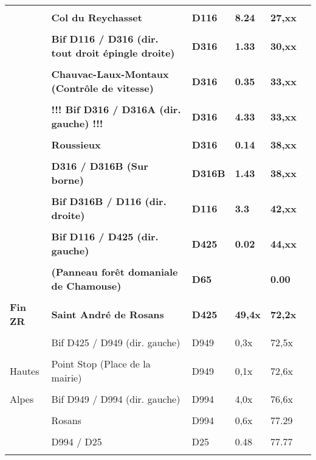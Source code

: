 \documentclass{article}%
\begin{document}
\begin{longtable}{p{2.25cm}|p{6.7cm}|p{2.0cm}|p{1.5cm}|p{1.5cm}|p{3.5cm}}
 & & & & & \\%
 &\textbf{Col du Reychasset}&\textbf{D116}&\textbf{8.24}&\textbf{27,xx}& \\%
 & & & & & \\%
 &\textbf{Bif D116 / D316 (dir. tout droit épingle droite)}&\textbf{D316}&\textbf{1.33}&\textbf{30,xx}& \\%
 & & & & & \\%
 &\textbf{Chauvac-Laux-Montaux (Contrôle de vitesse)}&\textbf{D316}&\textbf{0.35}&\textbf{33,xx}& \\%
 & & & & & \\%
 &\textbf{!!! Bif D316 / D316A (dir. gauche) !!!}&\textbf{D316}&\textbf{4.33}&\textbf{33,xx}& \\%
 & & & & & \\%
 &\textbf{Roussieux }&\textbf{D316 }&\textbf{0.14}&\textbf{38,xx}& \\%
 & & & & & \\%
 &\textbf{D316 / D316B (Sur borne)}&\textbf{D316B}&\textbf{1.43}&\textbf{38,xx}& \\%
 & & & & & \\%
 &\textbf{Bif D316B / D116 (dir. droite)}&\textbf{D116}&\textbf{3.3}&\textbf{42,xx}& \\%
 & & & & & \\%
 &\textbf{Bif D116 / D425 (dir. gauche)}&\textbf{D425}&\textbf{0.02}&\textbf{44,xx}& \\%
 & & & & & \\%
\textbf{ }&\textbf{(Panneau forêt domaniale de Chamouse)}&\textbf{D65}& &\textbf{0.00}& \\%
\hline& & & & & \\%
\textbf{Fin ZR }&\textbf{Saint André de Rosans }&\textbf{D425}&\textbf{49,4x}&\textbf{72,2x}& \\%
 & & & & & \\%
 &Bif D425 / D949 (dir. gauche)&D949&0,3x&72,5x& \\%
 & & & & & \\%
Hautes &Point Stop (Place de la mairie) &D949&0,1x&72,6x& \\%
 & & & & & \\%
Alpes&Bif D949 / D994 (dir. gauche)&D994&4,0x&76,6x& \\%
 & & & & & \\%
 &Rosans&D994&0,6x&77.29& \\%
 & & & & & \\%
 &D994 / D25&D25&0.48&77.77& \\%
 & & & & & \\%

\end{longtable}
\end{document}
